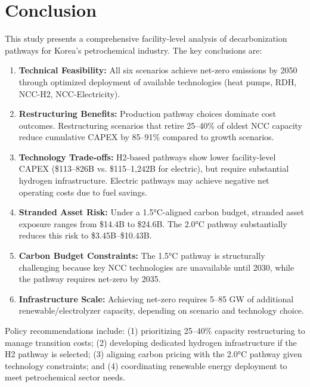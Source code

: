 \documentclass[12pt,a4paper]{article}
\begin{document}
\section{Conclusion}

This study presents a comprehensive facility-level analysis of decarbonization pathways for Korea's petrochemical industry. The key conclusions are:

\begin{enumerate}
\item \textbf{Technical Feasibility:} All six scenarios achieve net-zero emissions by 2050 through optimized deployment of available technologies (heat pumps, RDH, NCC-H2, NCC-Electricity).

\item \textbf{Restructuring Benefits:} Production pathway choices dominate cost outcomes. Restructuring scenarios that retire 25--40\% of oldest NCC capacity reduce cumulative CAPEX by 85--91\% compared to growth scenarios.

\item \textbf{Technology Trade-offs:} H2-based pathways show lower facility-level CAPEX (\$113--826B vs. \$115--1,242B for electric), but require substantial hydrogen infrastructure. Electric pathways may achieve negative net operating costs due to fuel savings.

\item \textbf{Stranded Asset Risk:} Under a 1.5°C-aligned carbon budget, stranded asset exposure ranges from \$14.4B to \$24.6B. The 2.0°C pathway substantially reduces this risk to \$3.45B--\$10.43B.

\item \textbf{Carbon Budget Constraints:} The 1.5°C pathway is structurally challenging because key NCC technologies are unavailable until 2030, while the pathway requires net-zero by 2035.

\item \textbf{Infrastructure Scale:} Achieving net-zero requires 5--85 GW of additional renewable/electrolyzer capacity, depending on scenario and technology choice.
\end{enumerate}

Policy recommendations include: (1) prioritizing 25--40\% capacity restructuring to manage transition costs; (2) developing dedicated hydrogen infrastructure if the H2 pathway is selected; (3) aligning carbon pricing with the 2.0°C pathway given technology constraints; and (4) coordinating renewable energy deployment to meet petrochemical sector needs.
\end{document}
